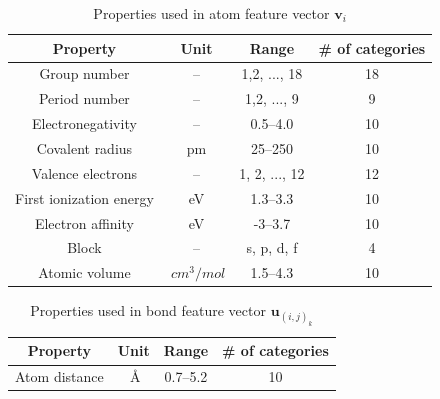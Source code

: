 \documentclass[twocolumn, prl]{revtex4-1}
\begin{document}
\begin{table}[htb]%
\caption{Properties used in atom feature vector $\bm{v}_i$}
\begin{ruledtabular}
\begin{tabular}{cccc}
  Property        & Unit		&	Range           & \# of categories    \\
  \hline
  Group number    & --    	&  1,2, ..., 18   & 18 					\\
  Period number	& --			&  1,2, ..., 9\footnotemark[1]	& 9					\\
  Electronegativity\cite{sanderson1951interpretation, sanderson1952explanation}	& --			&  0.5--4.0		& 10					\\
  Covalent radius\cite{cordero2008covalent}		& pm		&  25--250		& 10					\\
  Valence electrons		& -- 			&	1, 2, ..., 12	& 12					\\
  First ionization energy\cite{kramida2013nist}\footnotemark[2]		& eV			& 1.3--3.3		& 10					\\
  Electron affinity\cite{haynes2014crc}		& eV			& -3--3.7			& 10					\\
  Block     & --            & s, p, d, f    &   4   \\
  Atomic volume\footnotemark[2] & $\SI{}{cm^3/mol}$ & 1.5--4.3  & 10  \\

\end{tabular}
\end{ruledtabular}
\label{tab:atom-feature}
\end{table}


\begin{table}[htb]%
\caption{Properties used in bond feature vector $\bm{u}_{(i, j)_k}$}
\begin{ruledtabular}
\begin{tabular}{cccc}
  Property        & Unit		&	Range           & \# of categories    \\
  \hline
  Atom distance    & $\SI{}{\angstrom}$    	&  0.7--5.2   & 10 					\\

\end{tabular}
\end{ruledtabular}
\label{tab:bond-feature}
\end{table}
\end{document}
